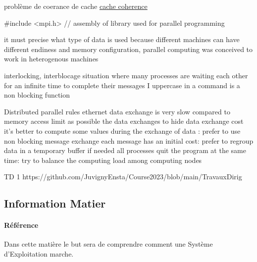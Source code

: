 \documentclass{article}
\begin{document}
problème de coerance de cache
\href{https://en.wikipedia.org/wiki/Cache_coherence}{cache coherence}

#include <mpi.h> // assembly of library used for parallel programming

it must precise what type of data is used because different machines can have different endiness and memory configuration, parallel computing was conceived to work in heterogenous machines



interlocking, interblocage
situation where many processes are waiting each other for an infinite time to complete their messages
I uppercase in a command is a non blocking function


Distributed parallel rules
    ethernet data exchange is very slow compared to memory access limit as possible the data exchanges
    to hide data exchange cost it's better to compute some values during the exchange of data : prefer to use non blocking message exchange
    each message has an initial cost: prefer to regroup data in a temporary buffer if needed
    all processes quit the program at the same time: try to balance the computing load among computing nodes


TD 1
https://github.com/JuvignyEnsta/Course2023/blob/main/TravauxDirig%



\subsection{Information Matier}
\paragraph{Référence}Dans cette matière le but sera de comprendre comment une Système d'Exploitation marche.
\end{document}
